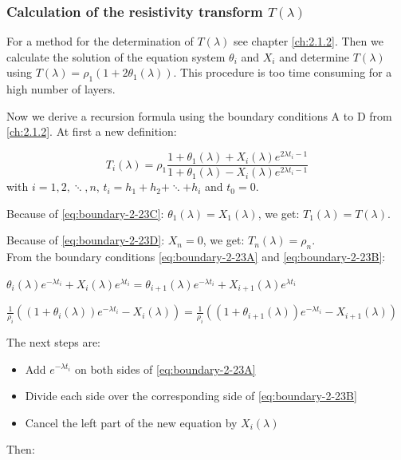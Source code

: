 \subsubsection{Calculation of the resistivity transform $T(\lambda)$}

For a method for the determination of $T(\lambda)$ see chapter \ref{ch:2.1.2}. Then we calculate the solution of the equation system $\theta_i$ and $X_i$ and determine $T(\lambda)$ using $T(\lambda)=\rho_1(1+2\theta_1(\lambda))$. This procedure is too time consuming for a high number of layers.

Now we derive a recursion formula using the boundary conditions A to D from \ref{ch:2.1.2}. At first a new definition:

\begin{equation}
T_i(\lambda)=\rho_1\frac{1+\theta_1(\lambda)+X_i(\lambda)e^{2\lambda t_i-1}}{1+\theta_1(\lambda)-X_i(\lambda)e^{2\lambda t_i-1}}
\label{eq:Tlambda}
\end{equation}
with $i=1,2,\ddots,n$, $t_i=h_1+h_2+\ddots+h_i$ and $t_0=0$.

Because of \eqref{eq:boundary-2-23C}: $\theta_1(\lambda)=X_1(\lambda)$, we get: $T_1(\lambda)=T(\lambda)$.

Because of \eqref{eq:boundary-2-23D}: $X_n=0$, we get: $T_n(\lambda)=\rho_n$.\\

From the boundary conditions \eqref{eq:boundary-2-23A} and \eqref{eq:boundary-2-23B}:\\

\begin{compactenum}[a)]
\item $\theta_i(\lambda)e^{-\lambda t_i}+X_i(\lambda)e^{\lambda t_i}=\theta_{i+1}(\lambda)e^{-\lambda t_i}+X_{i+1}(\lambda)e^{\lambda t_i}$\\


\item $\frac{1}{\rho_i}\left(\left(1+\theta_i(\lambda)\right)e^{-\lambda t_i}-X_i(\lambda)\right)=\frac{1}{\rho_i}\left(\left(1+\theta_{i+1}(\lambda)\right)e^{-\lambda t_i}-X_{i+1}(\lambda)\right)$
\end{compactenum}

The next steps are:
\begin{itemize}
\item Add $e^{-\lambda t_i}$ on both sides of \eqref{eq:boundary-2-23A}
\item Divide each side over the corresponding side of \eqref{eq:boundary-2-23B}
\item Cancel the left part of the new equation by $X_i(\lambda)$
\end{itemize}
Then:

